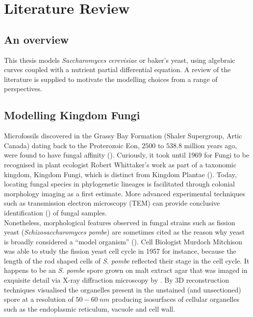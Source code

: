 \chapter{Literature Review}

\section{An overview}
This thesis models \textit{Saccharomyces cerevisiae} or baker's yeast, using algebraic curves 
coupled with a nutrient partial differential equation. A review of the literature is supplied 
to motivate the modelling choices from a range of perspectives.

\section{Modelling Kingdom Fungi}

Microfossils discovered in the Grassy Bay Formation 
(Shaler Supergroup, Artic Canada) dating back to the Proterozoic Eon, $2500$ to $538.8$ million years ago, were 
found to have fungal affinity (\cite{loron2019early}). Curiously, it took until 1969 for Fungi to be 
recognised in plant ecologist Robert Whittaker's work as part of a taxonomic kingdom, Kingdom Fungi,
which is distinct from Kingdom Plantae (\cite{whittaker1969new}). Today, locating fungal species 
in phylogenetic lineages is facilitated through colonial morphology imaging as a first 
estimate. More advanced experimental techniques such as transmission 
electron microscopy (TEM) can provide  
conclusive identification (\cite{loron2019early}) of fungal samples.
\\

Nonetheless, morphological features observed in fungal strains such as fission yeast 
(\textit{Schizosaccharomyces pombe}) are sometimes cited as the reason 
why yeast is broadly considered a ``model organism'' (\cite{hayles2018introduction}).
Cell Biologist Murdoch Mitchison was able to study the fission yeast cell cycle in 1957 for instance,
because the length of the rod shaped cells of \textit{S. pombe} reflected their stage in the cell cycle.
It happens to be an \textit{S. pombe} spore grown on malt extract agar that was imaged in exquisite detail via 
X-ray diffraction microscopy by \cite{jiang2010quantitative}. By 3D 
reconstruction techniques \cite{jiang2010quantitative} visualised the organelles
present in the unstained (and unsectioned) spore at a resolution of $50-60 \ nm$ 
producing isosurfaces of cellular organelles such as the endoplasmic reticulum, 
vacuole and cell wall.
\\

